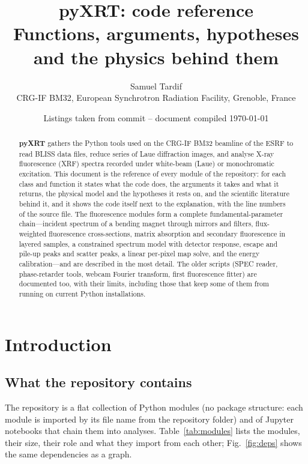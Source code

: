 \documentclass[11pt,a4paper]{article}
\title{\textbf{pyXRT}: code reference\\[4pt]
\large Functions, arguments, hypotheses and the physics behind them}
\author{Samuel Tardif\\[2pt]
\small CRG-IF BM32, European Synchrotron Radiation Facility, Grenoble, France}
\date{\small Listings taken from commit \sourceversion{} -- document compiled \today}
\begin{document}
\maketitle
\thispagestyle{empty}

\begin{abstract}
\noindent
\textbf{pyXRT} gathers the Python tools used on the CRG-IF BM32 beamline of the ESRF to read
BLISS data files, reduce series of Laue diffraction images, and analyse X-ray fluorescence
(XRF) spectra recorded under white-beam (Laue) or monochromatic excitation. This document is
the reference of every module of the repository: for each class and function it states what
the code does, the arguments it takes and what it returns, the physical model and the
hypotheses it rests on, and the scientific literature behind it, and it shows the code itself
next to the explanation, with the line numbers of the source file. The fluorescence modules
form a complete fundamental-parameter chain---incident spectrum of a bending magnet through
mirrors and filters, flux-weighted fluorescence cross-sections, matrix absorption and
secondary fluorescence in layered samples, a constrained spectrum model with detector
response, escape and pile-up peaks and scatter peaks, a linear per-pixel map solve, and the
energy calibration---and are described in the most detail. The older scripts (SPEC reader,
phase-retarder tools, webcam Fourier transform, first fluorescence fitter) are documented
too, with their limits, including those that keep some of them from running on current Python
installations.
\end{abstract}

\tableofcontents
\clearpage

\section{Introduction}

\subsection{What the repository contains}

The repository is a flat collection of Python modules (no package structure: each module is
imported by its file name from the repository folder) and of Jupyter notebooks that chain
them into analyses. Table~\ref{tab:modules} lists the modules, their size, their role and
what they import from each other; Fig.~\ref{fig:deps} shows the same dependencies as a graph.
\end{document}
